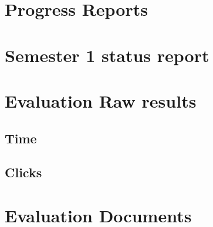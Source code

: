 \documentclass{l4proj}
\begin{document}
\begin{appendices}
	\chapter{Progress Reports}
	
	
	
	
	
	
	
	
	
	
	
	
	
	
	
	
	
	
	
	
	
	
	\chapter{Semester 1 status report}
		
	\chapter{Evaluation Raw results}
	\clearpage
	\begin{minipage}{\textwidth}
		\section{Time}
		
	\end{minipage}
	\clearpage
	\begin{minipage}{\textwidth}
		\section{Clicks}
		
	\end{minipage}
	\chapter{Evaluation Documents}
	\clearpage
	\begin{minipage}{\textwidth}

\end{minipage}
\end{appendices}
\end{document}

